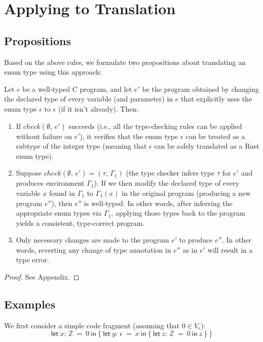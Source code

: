 \documentclass[peerreview, 10pt]{IEEEtran}
\newcommand{\Z}{\ensuremath{\mathbb{Z}}}
\newcommand{\lett}[4]{\ensuremath{\mathsf{let}\ #1\mathsf{:}\,#2\ \mathsf{=}\ #3\ \mathsf{in}\ #4}}
\newcommand{\checktype}[4]{\ensuremath{{check}(#1,\,#2)=(#3,\,#4)}}
\begin{document}
\section{Applying to Translation}

\subsection{Propositions}

Based on the above rules, we formulate two propositions about translating an enum type using this approach:

Let $e$ be a well-typed C program, and let $e'$ be the program obtained by changing the declared type of every variable (and parameter) in $e$ that explicitly uses the enum type $\epsilon$ to $\epsilon$ (if it isn't already). Then:
\begin{enumerate}
    \item If $check(\emptyset,\, e')$ succeeds (i.e., all the type-checking rules can be applied without failure on $e'$), it verifies that the enum type $\epsilon$ can be treated as a subtype of the integer type (meaning that $\epsilon$ can be safely translated as a Rust enum type).
    \item Suppose $\checktype{\emptyset}{e'}{\tau}{\Gamma_1}$ (the type checker infers type $\tau$ for $e'$ and produces environment $\Gamma_1$). If we then modify the declared type of every variable $x$ found in $\Gamma_1$ to $\Gamma_1(x)$ in the original program (producing a new program $e''$), then $e''$ is well-typed. In other words, after inferring the appropriate enum types via $\Gamma_1$, applying those types back to the program yields a consistent, type-correct program.
    \item Only necessary changes are made to the program $e'$ to produce $e''$. In other words, reverting any change of type annotation in $e''$ as in $e'$ will result in a type error.
\end{enumerate}

\begin{proof}
    See Appendix.
\end{proof}

\subsection{Examples}
We first consider a simple code fragment (assuming that $0 \in V_\epsilon$):
\[
\lett{x}{\Z}{0}{
    \{\ \lett{y}{\epsilon}{x}{\{\ 
        \lett{z}{\Z}{0}{z}
    \ \}}\ \}
}\]
\end{document}
